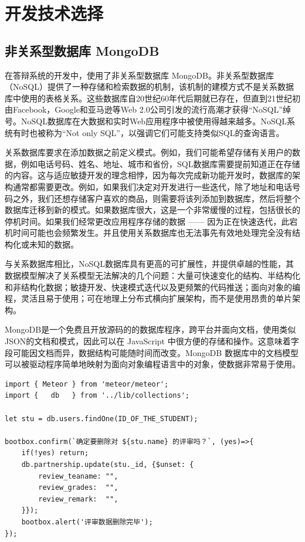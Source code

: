 \section{开发技术选择}

\subsection{非关系型数据库 MongoDB}

在答辩系统的开发中，使用了非关系型数据库 MongoDB。非关系型数据库（NoSQL）提供了一种存储和检索数据的机制，该机制的建模方式不是关系数据库中使用的表格关系。这些数据库自20世纪60年代后期就已存在，但直到21世纪初由Facebook，Google和亚马逊等Web 2.0公司引发的流行高潮才获得“NoSQL”绰号。NoSQL数据库在大数据和实时Web应用程序中被使用得越来越多。NoSQL系统有时也被称为“Not only SQL”，以强调它们可能支持类似SQL的查询语言。

关系数据库要求在添加数据之前定义模式。例如，我们可能希望存储有关用户的数据，例如电话号码、姓名、地址、城市和省份，SQL数据库需要提前知道正在存储的内容。这与适应敏捷开发的理念相悖，因为每次完成新功能开发时，数据库的架构通常都需要更改。例如，如果我们决定对开发进行一些迭代，除了地址和电话号码之外，我们还想存储客户喜欢的商品，则需要将该列添加到数据库，然后将整个数据库迁移到新的模式。如果数据库很大，这是一个非常缓慢的过程，包括很长的停机时间。如果我们经常更改应用程序存储的数据 —— 因为正在快速迭代，此宕机时间可能也会频繁发生。并且使用关系数据库也无法事先有效地处理完全没有结构化或未知的数据。

与关系数据库相比，NoSQL数据库具有更高的可扩展性，并提供卓越的性能，其数据模型解决了关系模型无法解决的几个问题：大量可快速变化的结构、半结构化和非结构化数据；敏捷开发、快速模式迭代以及更频繁的代码推送；面向对象的编程，灵活且易于使用；可在地理上分布式横向扩展架构，而不是使用昂贵的单片架构。

MongoDB是一个免费且开放源码的的数据库程序，跨平台并面向文档，使用类似JSON的文档和模式，因此可以在 JavaScript 中很方便的存储和操作。这意味着字段可能因文档而异，数据结构可能随时间而改变。MongoDB 数据库中的文档模型可以被驱动程序简单地映射为面向对象编程语言中的对象，使数据非常易于使用。

\begin{lstlisting}[title=代码 3-1：“面向对象”的数据库操作示例]
import { Meteor } from 'meteor/meteor';
import {   db   } from '../lib/collections';

let stu = db.users.findOne(ID_OF_THE_STUDENT);

bootbox.confirm(`确定要删除对 ${stu.name} 的评审吗？`, (yes)=>{
	if(!yes) return;
	db.partnership.update(stu._id, {$unset: {
		review_teaname: "",
		review_grades:  "",  
		review_remark:  "",
	}});
	bootbox.alert('评审数据删除完毕');
});
\end{lstlisting}

